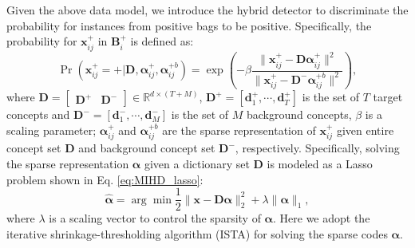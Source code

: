 \documentclass{article}
\begin{document}
	Given the above data model, we introduce the hybrid detector to discriminate the probability for instances from positive bags to be positive. Specifically, the probability for $\mathbf{x}_{ij}^+$ in $\mathbf{B}_i^+$ is defined as: 
	\begin{equation}
	\Pr(\mathbf{x}_{ij}^+=+|\mathbf{D},\boldsymbol{\alpha}_{ij}^+,\boldsymbol{\alpha}_{ij}^{+b})=\exp\left(-\beta\frac{\|\mathbf{x}_{ij}^+-\mathbf{D}\boldsymbol{\alpha}_{ij}^+\|^2}{\|\mathbf{x}_{ij}^+-\mathbf{D}^-\boldsymbol{\alpha}_{ij}^{+b}\|^2}\right),
	\label{eq:MIHD_pos_inst_model}
	\end{equation}
	where $\mathbf{D}=\begin{bmatrix}\mathbf{D}^+ & \mathbf{D}^-\end{bmatrix}\in\mathbb{R}^{d\times (T+M)}$, $\mathbf{D}^+ = \left[\mathbf{d}_{1}^+,\cdots,\mathbf{d}_{T}^+\right]$ is the set of $T$ target  concepts and $\mathbf{D}^- = \left[\mathbf{d}_{1}^-,\cdots,\mathbf{d}_{M}^-\right]$ is the set of $M$ background  concepts, $\beta$ is a scaling parameter;  $\boldsymbol{\alpha}_{ij}^{+}$ and $\boldsymbol{\alpha}_{ij}^{+b}$ are the sparse representation of $\mathbf{x}_{ij}^+$ given entire concept set $\mathbf{D}$ and background concept set $\mathbf{D}^-$, respectively. Specifically, solving the sparse representation $\boldsymbol{\alpha}$ given a dictionary set $\mathbf{D}$ is modeled as a Lasso problem \cite{tibshirani1996regression, chen2001atomic} shown in Eq. \eqref{eq:MIHD_lasso}:
	\begin{equation}
	\hat{\boldsymbol{\alpha}}=\arg\min\frac{1}{2}\|\mathbf{x}-\mathbf{D}\boldsymbol{\alpha}\|^2_2+\lambda\|\boldsymbol{\alpha}\|_1,
	\label{eq:MIHD_lasso}
	\end{equation}
	where $\lambda$ is a scaling vector to control the sparsity of $\boldsymbol{\alpha}$. Here we adopt the iterative shrinkage-thresholding algorithm (ISTA) \cite{daubechies2003iterative} for solving the sparse codes  $\boldsymbol{\alpha}$.
	
	
\end{document}
